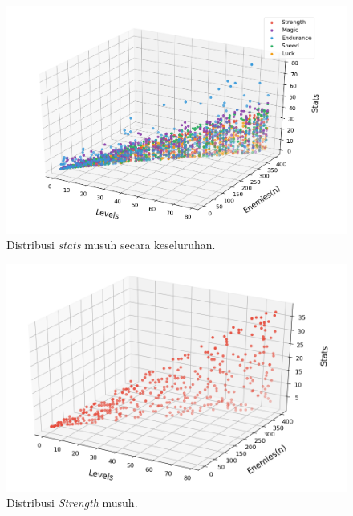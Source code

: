\begin{figure} [!h] \centering
	\includegraphics[scale=0.58]{img/EnemyStatsDistrib.png}
	\caption{Distribusi \textit{stats} musuh secara keseluruhan.}
	\label{fig:enemy_stats_distrib}
	\vspace{2ex}
\end{figure}

\begin{figure} [!h] \centering
	\includegraphics[scale=0.58]{img/EnemyStrengthDistrib.png}
	\caption{Distribusi \textit{Strength} musuh.}
	\label{fig:enemy_str_distrib}
\end{figure}


